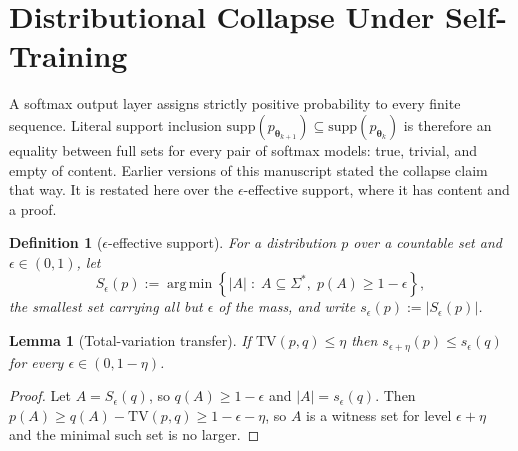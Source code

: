 \documentclass[11pt,a4paper]{article}
\newtheorem{lemma}[theorem]{Lemma}
\newtheorem{definition}[theorem]{Definition}
\DeclareMathOperator*{\argmin}{arg\,min}
\begin{document}
\section{Distributional Collapse Under Self-Training}

A softmax output layer assigns strictly positive probability to every finite sequence. Literal support inclusion $\mathrm{supp}(p_{\bm{\theta}_{k+1}}) \subseteq \mathrm{supp}(p_{\bm{\theta}_k})$ is therefore an equality between full sets for every pair of softmax models: true, trivial, and empty of content. Earlier versions of this manuscript stated the collapse claim that way. It is restated here over the $\epsilon$-effective support, where it has content and a proof.

\begin{definition}[$\epsilon$-effective support]
\label{def:eff_support}
For a distribution $p$ over a countable set and $\epsilon \in (0,1)$, let
\begin{equation}
S_\epsilon(p) := \argmin\left\{ |A| \;:\; A \subseteq \Sigma^*,\; p(A) \geq 1 - \epsilon \right\},
\end{equation}
the smallest set carrying all but $\epsilon$ of the mass, and write $s_\epsilon(p) := |S_\epsilon(p)|$.
\end{definition}

\begin{lemma}[Total-variation transfer]
\label{lem:tv_transfer}
If $\mathrm{TV}(p, q) \leq \eta$ then $s_{\epsilon + \eta}(p) \leq s_{\epsilon}(q)$ for every $\epsilon \in (0, 1-\eta)$.
\end{lemma}

\begin{proof}
Let $A = S_\epsilon(q)$, so $q(A) \geq 1-\epsilon$ and $|A| = s_\epsilon(q)$. Then $p(A) \geq q(A) - \mathrm{TV}(p,q) \geq 1 - \epsilon - \eta$, so $A$ is a witness set for level $\epsilon + \eta$ and the minimal such set is no larger.
\end{proof}
\end{document}
